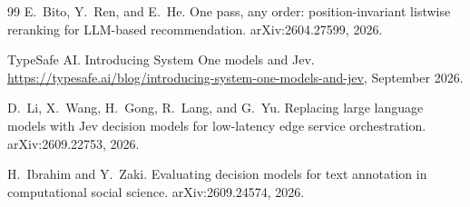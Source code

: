 \documentclass[11pt]{article}
\begin{document}
\begin{thebibliography}{99}
E.~Bito, Y.~Ren, and E.~He.
\newblock One pass, any order: position-invariant listwise reranking for LLM-based
  recommendation.
\newblock arXiv:2604.27599, 2026.

TypeSafe AI.
\newblock Introducing System One models and Jev.
\newblock \url{https://typesafe.ai/blog/introducing-system-one-models-and-jev}, September
  2026.

D.~Li, X.~Wang, H.~Gong, R.~Lang, and G.~Yu.
\newblock Replacing large language models with Jev decision models for low-latency edge
  service orchestration.
\newblock arXiv:2609.22753, 2026.

H.~Ibrahim and Y.~Zaki.
\newblock Evaluating decision models for text annotation in computational social science.
\newblock arXiv:2609.24574, 2026.

\end{thebibliography}
\end{document}
